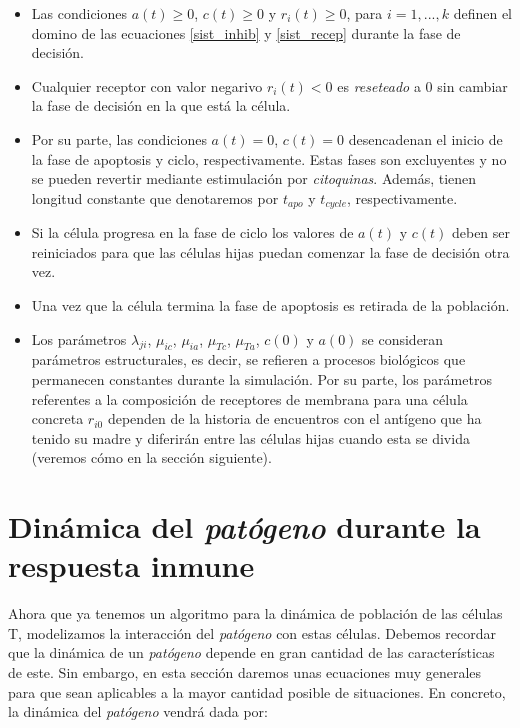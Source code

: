 \begin{itemize}
	\item Las condiciones $a(t)\geq0$, $c(t)\geq0$ y $r_i(t)\geq0$, para $i=1,...,k$ definen el domino de las ecuaciones \ref{sist_inhib} y \ref{sist_recep} durante la fase de decisión. 
	
	\item Cualquier receptor con valor negarivo $r_i(t) < 0$ es \textit{reseteado} a 0 sin cambiar la fase de decisión en la que está la célula.
	
	\item Por su parte, las condiciones $a(t)=0$, $c(t)=0$ desencadenan el inicio de la fase de apoptosis y ciclo, respectivamente. Estas fases son excluyentes y no se pueden revertir mediante estimulación por \textit{citoquinas}. Además, tienen longitud constante que denotaremos por $t_{apo}$ y $t_{cycle}$, respectivamente.
	
	\item Si la célula progresa en la fase de ciclo los valores de $a(t)$ y $c(t)$ deben ser reiniciados para que las células hijas puedan comenzar la fase de decisión otra vez. 
	
	\item Una vez que la célula termina la fase de apoptosis es retirada de la población.
	
	\item Los parámetros $\lambda_{ji}$, $\mu_{ic}$, $\mu_{ia}$, $\mu_{Tc}$, $\mu_{Ta}$, $c(0)$ y $a(0)$ se consideran parámetros estructurales, es decir, se refieren a procesos biológicos que permanecen constantes durante la simulación. Por su parte, los parámetros referentes a la composición de receptores de membrana para una célula concreta $r_{i0}$ dependen de la historia de encuentros con el antígeno que ha tenido su madre y diferirán entre las células hijas cuando esta se divida (veremos cómo en la sección siguiente).
\end{itemize}


\section{Dinámica del \textit{patógeno} durante la respuesta inmune}
\label{sec:modeloPatCelT}

Ahora que ya tenemos un algoritmo para la dinámica de población de las células T, modelizamos la interacción del \textit{patógeno} con estas células. Debemos recordar que la dinámica de un \textit{patógeno} depende en gran cantidad de las características de este. Sin embargo, en esta sección daremos unas ecuaciones muy generales para que sean aplicables a la mayor cantidad posible de situaciones. En concreto, la dinámica del \textit{patógeno} vendrá dada por:

